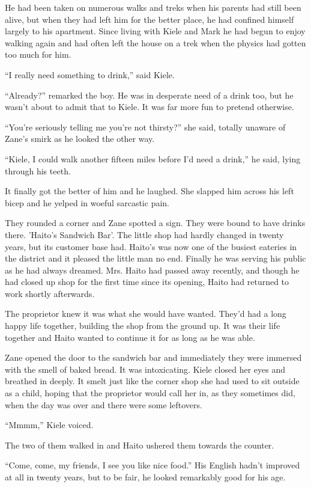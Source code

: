 He had been taken on numerous walks and treks when his parents had still been alive, but when they had left him for the better place, he had confined himself largely to his apartment.  Since living with Kiele and Mark he had begun to enjoy walking again and had often left the house on a trek when the physics had gotten too much for him.

``I really need something to drink,'' said Kiele.  

``Already?'' remarked the boy.  He was in desperate need of a drink too, but he wasn't about to admit that to Kiele.  It was far more fun to pretend otherwise.

``You're seriously telling me you're not thirsty?'' she said, totally unaware of Zane's smirk as he looked the other way.

``Kiele, I could walk another fifteen miles before I'd need a drink,'' he said, lying through his teeth.

It finally got the better of him and he laughed.  She slapped him across his left bicep and he yelped in woeful sarcastic pain.

They rounded a corner and Zane spotted a sign.  They were bound to have drinks there.  'Haito's Sandwich Bar'.  The little shop had hardly changed in twenty years, but its customer base had.  Haito's was now one of the busiest eateries in the district and it pleased the little man no end.  Finally he was serving his public as he had always dreamed.  Mrs. Haito had passed away recently, and though he had closed up shop for the first time since its opening, Haito had returned to work shortly afterwards.  

The proprietor knew it was what she would have wanted.  They'd had a long happy life together, building the shop from the ground up.  It was their life together and Haito wanted to continue it for as long as he was able.

Zane opened the door to the sandwich bar and immediately they were immersed with the smell of baked bread.  It was intoxicating.  Kiele closed her eyes and breathed in deeply.  It smelt just like the corner shop she had used to sit outside as a child, hoping that the proprietor would call her in, as they sometimes did, when the day was over and there were some leftovers.

``Mmmm,'' Kiele voiced.

The two of them walked in and Haito ushered them towards the counter.  

``Come, come, my friends, I see you like nice food.''  His English hadn't improved at all in twenty years, but to be fair, he looked remarkably good for his age.  

